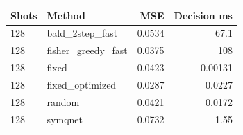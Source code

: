 \begin{tabular}{llrr}
\toprule
Shots & Method & MSE & Decision ms \\
\midrule
128 & bald\_2step\_fast & 0.0534 & 67.1 \\
128 & fisher\_greedy\_fast & 0.0375 & 108 \\
128 & fixed & 0.0423 & 0.00131 \\
128 & fixed\_optimized & 0.0287 & 0.0227 \\
128 & random & 0.0421 & 0.0172 \\
128 & symqnet & 0.0732 & 1.55 \\
\bottomrule
\end{tabular}
